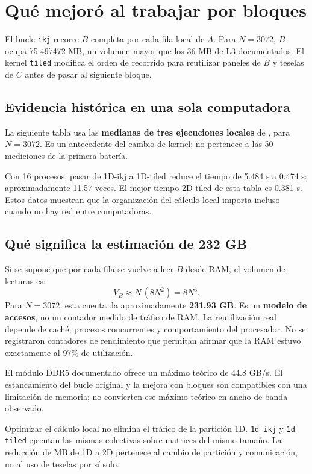 \section{Qué mejoró al trabajar por bloques}

El bucle \texttt{ikj} recorre $B$ completa por cada fila local de $A$. Para $N=3072$, $B$ ocupa 75.497472 MB, un volumen mayor que los 36 MB de L3 documentados. El kernel \texttt{tiled} modifica el orden de recorrido para reutilizar paneles de $B$ y teselas de $C$ antes de pasar al siguiente bloque.

\subsection{Evidencia histórica en una sola computadora}
La siguiente tabla usa las \textbf{medianas de tres ejecuciones locales} de , para $N=3072$. Es un antecedente del cambio de kernel; no pertenece a las 50 mediciones de la primera batería.


Con 16 procesos, pasar de 1D-ikj a 1D-tiled reduce el tiempo de 5.484 s a 0.474 s: aproximadamente 11.57 veces. El mejor tiempo 2D-tiled de esta tabla es 0.381 s. Estos datos muestran que la organización del cálculo local importa incluso cuando no hay red entre computadoras.

\subsection{Qué significa la estimación de 232 GB}
Si se supone que por cada fila se vuelve a leer $B$ desde RAM, el volumen de lecturas es:
\[
 V_B\approx N\,(8N^2)=8N^3.
\]
Para $N=3072$, esta cuenta da aproximadamente \textbf{231.93 GB}. Es un \textbf{modelo de accesos}, no un contador medido de tráfico de RAM. La reutilización real depende de caché, procesos concurrentes y comportamiento del procesador. No se registraron contadores de rendimiento que permitan afirmar que la RAM estuvo exactamente al 97\% de utilización.

El módulo DDR5 documentado ofrece un máximo teórico de 44.8 GB/s. El estancamiento del bucle original y la mejora con bloques son compatibles con una limitación de memoria; no convierten ese máximo teórico en ancho de banda observado.

\begin{idea}
Optimizar el cálculo local no elimina el tráfico de la partición 1D. \texttt{1d ikj} y \texttt{1d tiled} ejecutan las mismas colectivas sobre matrices del mismo tamaño. La reducción de MB de 1D a 2D pertenece al cambio de partición y comunicación, no al uso de teselas por sí solo.
\end{idea}

